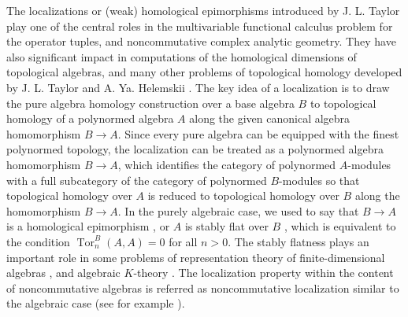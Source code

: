 \documentclass[12pt,reqno]{amsart}%
\theoremstyle{plain}
\numberwithin{theorem}{section} \numberwithin{equation}{section}
\numberwithin{lemma}{section}
\numberwithin{remark}{section}
\numberwithin{example}{section}
\numberwithin{proposition}{section}
\numberwithin{definition}{section}
\numberwithin{corollary}{section}
\begin{document}
The localizations or (weak) homological epimorphisms introduced by J. L.
Taylor \cite{Tay2} play one of the central roles in the multivariable
functional calculus problem for the operator tuples, and noncommutative
complex analytic geometry. They have also significant impact in computations
of the homological dimensions of topological algebras, and many other problems
of topological homology developed by J. L. Taylor \cite{TayHom} and A. Ya.
Helemskii \cite{HelHom}. The key idea of a localization is to draw the pure
algebra homology construction over a base algebra $B$ to topological homology
of a polynormed algebra $A$ along the given canonical algebra homomorphism
$B\rightarrow A$. Since every pure algebra can be equipped with the finest
polynormed topology, the localization can be treated as a polynormed algebra
homomorphism $B\rightarrow A$, which identifies the category of polynormed
$A$-modules with a full subcategory of the category of polynormed $B$-modules
so that topological homology over $A$ is reduced to topological homology over
$B$ along the homomorphism $B\rightarrow A$. In the purely algebraic case, we
used to say that $B\rightarrow A$ is a homological epimorphism \cite{GL}, or
$A$ is stably flat over $B$ \cite{NR}, which is equivalent to the condition
$\operatorname{Tor}_{n}^{B}\left(  A,A\right)  =0$ for all $n>0$. The stably
flatness plays an important role in some problems of representation theory of
finite-dimensional algebras \cite{GBW}, and algebraic $K$-theory \cite{NR}.
The localization property within the content of noncommutative algebras is
referred as noncommutative localization similar to the algebraic case (see for
example \cite{NR}).
\end{document}
